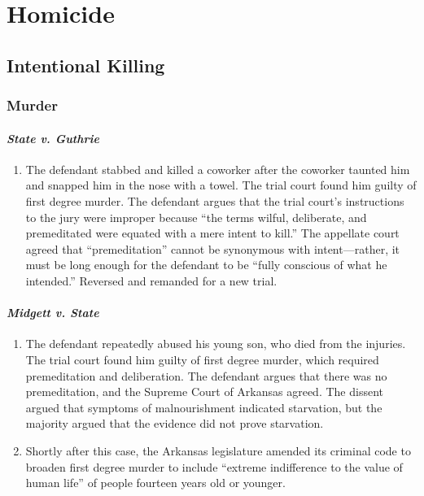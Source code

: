 \section{Homicide}

\subsection{Intentional Killing}

\subsubsection{Murder}

\paragraph{\emph{State v. Guthrie}}

\begin{enumerate}
    \item The defendant stabbed and killed a coworker after the coworker taunted him and snapped him in the nose with a towel. The trial court found him guilty of first degree murder. The defendant argues that the trial court's instructions to the jury were improper because ``the terms wilful, deliberate, and premeditated were equated with a mere intent to kill.'' The appellate court agreed that ``premeditation'' cannot be synonymous with intent---rather, it must be long enough for the defendant to be ``fully conscious of what he intended.'' Reversed and remanded for a new trial.
\end{enumerate}

\paragraph{\emph{Midgett v. State}}

\begin{enumerate}
    \item The defendant repeatedly abused his young son, who died from the injuries. The trial court found him guilty of first degree murder, which required premeditation and deliberation. The defendant argues that there was no premeditation, and the Supreme Court of Arkansas agreed. The dissent argued that symptoms of malnourishment indicated starvation, but the majority argued that the evidence did not prove starvation.
    \item Shortly after this case, the Arkansas legislature amended its criminal code to broaden first degree murder to include ``extreme indifference to the value of human life'' of people fourteen years old or younger.
\end{enumerate}


